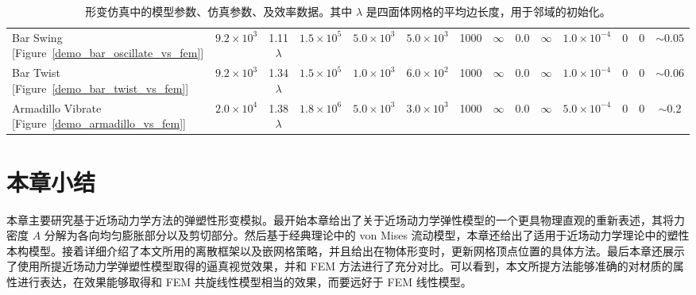 \begin{table}[htb]
{{\begin{tabular}{lccccccccccccc}
  Bar Swing [Figure~\ref{demo_bar_oscillate_vs_fem}]     & $9.2\times10^3$ & 1.11 $\lambda$ & $1.5\times10^5$ & $5.0\times10^3$   & $5.0\times10^3$          & 1000 & $\infty $ & 0.0             & $\infty$ & $1.0\times10^{-4}$ &0&0& $\sim0.05$ \\
  Bar Twist [Figure~\ref{demo_bar_twist_vs_fem}]     & $9.2\times10^3$ & 1.34 $\lambda$ & $1.5\times10^5$ & $1.0\times10^3$   & $6.0\times10^2$          & 1000 & $\infty $ & 0.0             & $\infty$ & $1.0\times10^{-4}$ &0&0& $\sim0.06$ \\
  Armadillo Vibrate [Figure~\ref{demo_armadillo_vs_fem}]     & $2.0\times10^4$ & 1.38 $\lambda$ & $1.8\times10^6$ & $5.0\times10^3$   & $3.0\times10^3$          & 1000 & $\infty $ & 0.0             & $\infty$ & $5.0\times10^{-4}$ &0&0& $\sim0.2$ \\
  \hline
\end{tabular}
}
}
\caption{形变仿真中的模型参数、仿真参数、及效率数据。其中 $\lambda$ 是四面体网格的平均边长度，用于邻域的初始化。}
\label{deformation_results_table}
\end{table}

\section{本章小结}
本章主要研究基于近场动力学方法的弹塑性形变模拟。最开始本章给出了关于近场动力学弹性模型的一个更具物理直观的重新表述，其将力密度 $A$ 分解为各向均匀膨胀部分以及剪切部分。然后基于经典理论中的 von Mises 流动模型，本章还给出了适用于近场动力学理论中的塑性本构模型。接着详细介绍了本文所用的离散框架以及嵌网格策略，并且给出在物体形变时，更新网格顶点位置的具体方法。最后本章还展示了使用所提近场动力学弹塑性模型取得的逼真视觉效果，并和 FEM 方法进行了充分对比。可以看到，本文所提方法能够准确的对材质的属性进行表达，在效果能够取得和 FEM 共旋线性模型相当的效果，而要远好于 FEM 线性模型。
